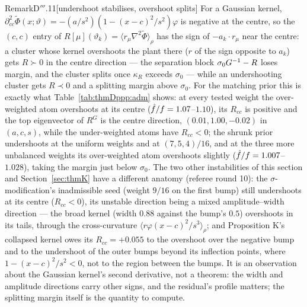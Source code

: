 \begin{rmk}{Remark}{D$'''$.11}[undershoot stabilises, overshoot splits]
For a Gaussian kernel, $\partial^2_{cc}\tilde\Phi(x;\vartheta) = -(a/s^2)(1 - (x - c)^2/s^2)\varphi$ is negative at
the centre, so the $(c,c)$ entry of $R[\mu](\vartheta_k) = \langle r_\mu\nabla^2\tilde\Phi\rangle_\rho$ has the sign
of $-a_k\cdot r_\mu$ near the centre: a cluster whose kernel overshoots the plant there ($r$ of the sign opposite to
$a_k$) gets $R\succ0$ in the centre direction --- the separation block $\sigma_0G^{-1} - R$ loses margin, and the
cluster splits once $\kappa_R$ exceeds $\sigma_0$ --- while an undershooting cluster gets $R\prec0$ and a splitting
margin above $\sigma_0$. For the matching prior this is exactly what Table~\ref{tab:thmDppp:adm} shows: at every
tested weight the over-weighted atom overshoots at its centre ($\hat f/f = 1.07$--$1.10$), its $R_{cc}$ is positive
and the top eigenvector of $R^G$ is the centre direction, $(0.01, 1.00, -0.02)$ in $(a,c,s)$, while the
under-weighted atoms have $R_{cc} < 0$; the shrunk prior undershoots at the uniform weights and at $(7,5,4)/16$, and
at the three more unbalanced weights its over-weighted atom overshoots slightly ($\hat f/f = 1.007$--$1.028$), taking
the margin just below $\sigma_0$. The two other instabilities of this section and Section~\ref{sec:thmK} have a
different anatomy (referee round 10): the $\sigma$-modification's inadmissible seed (weight $9/16$ on the first
bump) still undershoots at its centre ($R_{cc} < 0$), its unstable direction being a mixed amplitude--width
direction --- the broad kernel (width $0.88$ against the bump's $0.5$) overshoots in its tails, through the
cross-curvature $\langle r\varphi(x - c)^2/s^3\rangle_\rho$; and Proposition K's collapsed kernel owes its
$R_{cc} = +0.055$ to the overshoot over the negative bump and to the undershoot of the outer bumps beyond its
inflection points, where $1 - (x - c)^2/s^2 < 0$, not to the region between the bumps. It is an observation about
the Gaussian kernel's second derivative, not a theorem: the width and amplitude directions carry other signs, and
the residual's profile matters; the splitting margin itself is the quantity to compute.
\end{rmk}

